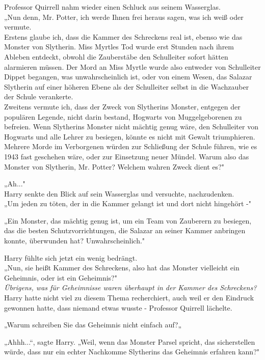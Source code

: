 {Professor Quirrell nahm wieder einen Schluck aus seinem Wasserglas.\\ „Nun denn, Mr. Potter, ich werde Ihnen frei heraus sagen, was ich weiß oder vermute.\\ Erstens glaube ich, dass die Kammer des Schreckens real ist, ebenso wie das Monster von Slytherin. Miss Myrtles Tod wurde erst Stunden nach ihrem Ableben entdeckt, obwohl die Zauberstäbe den Schulleiter sofort hätten alarmieren müssen. Der Mord an Miss Myrtle wurde also entweder von Schulleiter Dippet begangen, was unwahrscheinlich ist, oder von einem Wesen, das Salazar Slytherin auf einer höheren Ebene als der Schulleiter selbst in die Wachzauber der Schule verankerte.\\ Zweitens vermute ich, dass der Zweck von Slytherins Monster, entgegen der populären Legende, nicht darin bestand, Hogwarts von Muggelgeborenen zu befreien. Wenn Slytherins Monster nicht mächtig genug wäre, den Schulleiter von Hogwarts und alle Lehrer zu besiegen, könnte es nicht mit Gewalt triumphieren.\\ Mehrere Morde im Verborgenen würden zur Schließung der Schule führen, wie es 1943 fast geschehen wäre, oder zur Einsetzung neuer Mündel. Warum also das Monster von Slytherin, Mr. Potter? Welchem wahren Zweck dient es?"

„Ah..."\\ Harry senkte den Blick auf sein Wasserglas und versuchte, nachzudenken.\\ „Um jeden zu töten, der in die Kammer gelangt ist und dort nicht hingehört -"

„Ein Monster, das mächtig genug ist, um ein Team von Zauberern zu besiegen, das die besten Schutzvorrichtungen, die Salazar an seiner Kammer anbringen konnte, überwunden hat? Unwahrscheinlich."

Harry fühlte sich jetzt ein wenig bedrängt.\\ „Nun, sie heißt Kammer des Schreckens, also hat das Monster vielleicht ein Geheimnis, oder ist ein Geheimnis?"\\ \emph{Übrigens, was für Geheimnisse waren überhaupt in der Kammer des Schreckens?} Harry hatte nicht viel zu diesem Thema recherchiert, auch weil er den Eindruck gewonnen hatte, dass niemand etwas wusste - Professor Quirrell lächelte.

„Warum schreiben Sie das Geheimnis nicht einfach auf?„

„Ahhh...“, sagte Harry. „Weil, wenn das Monster Parsel spricht, das sicherstellen würde, dass nur ein echter Nachkomme Slytherins das Geheimnis erfahren kann?"

}
